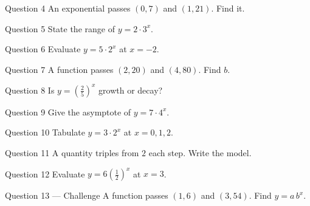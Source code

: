 \documentclass[11pt]{article}
\begin{document}
\begin{qbox}{Question 4}
An exponential passes $(0,7)$ and $(1,21)$. Find it.\workspace{2.4cm}
\end{qbox}

\begin{qbox}{Question 5}
State the range of $y=2\cdot3^{x}$.\workspace{2.4cm}
\end{qbox}

\begin{qbox}{Question 6}
Evaluate $y=5\cdot2^{x}$ at $x=-2$.\workspace{2.4cm}
\end{qbox}

\begin{qbox}{Question 7}
A function passes $(2,20)$ and $(4,80)$. Find $b$.\workspace{2.4cm}
\end{qbox}

\begin{qbox}{Question 8}
Is $y=\left(\tfrac25\right)^{x}$ growth or decay?\workspace{2.4cm}
\end{qbox}

\begin{qbox}{Question 9}
Give the asymptote of $y=7\cdot4^{x}$.\workspace{2.4cm}
\end{qbox}

\begin{qbox}{Question 10}
Tabulate $y=3\cdot2^{x}$ at $x=0,1,2$.\workspace{2.4cm}
\end{qbox}

\begin{qbox}{Question 11}
A quantity triples from $2$ each step. Write the model.\workspace{2.4cm}
\end{qbox}

\begin{qbox}{Question 12}
Evaluate $y=6\left(\tfrac12\right)^{x}$ at $x=3$.\workspace{2.4cm}
\end{qbox}

\begin{qbox}{Question 13 --- Challenge}
A function passes $(1,6)$ and $(3,54)$. Find $y=a\,b^{x}$.\workspace{3cm}
\end{qbox}

\clearpage
{}
\end{document}
